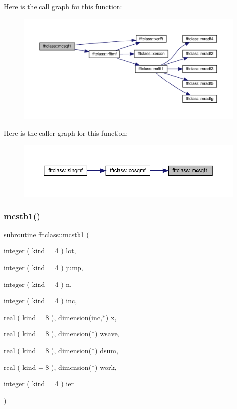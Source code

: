 Here is the call graph for this function\+:\nopagebreak
\begin{figure}[H]
\begin{center}
\leavevmode
\includegraphics[width=350pt]{namespacefftclass_a05d00644e8642979b2c55b7822bbfb03_cgraph}
\end{center}
\end{figure}
Here is the caller graph for this function\+:\nopagebreak
\begin{figure}[H]
\begin{center}
\leavevmode
\includegraphics[width=350pt]{namespacefftclass_a05d00644e8642979b2c55b7822bbfb03_icgraph}
\end{center}
\end{figure}
\mbox{\label{namespacefftclass_a10f96df2a58ce7f2e6ac9eaddf09588e}} 
\subsubsection{\texorpdfstring{mcstb1()}{mcstb1()}}
{\footnotesize\ttfamily subroutine fftclass\+::mcstb1 (\begin{DoxyParamCaption}\item[{integer ( kind = 4 )}]{lot,  }\item[{integer ( kind = 4 )}]{jump,  }\item[{integer ( kind = 4 )}]{n,  }\item[{integer ( kind = 4 )}]{inc,  }\item[{real ( kind = 8 ), dimension(inc,$\ast$)}]{x,  }\item[{real ( kind = 8 ), dimension($\ast$)}]{wsave,  }\item[{real ( kind = 8 ), dimension($\ast$)}]{dsum,  }\item[{real ( kind = 8 ), dimension($\ast$)}]{work,  }\item[{integer ( kind = 4 )}]{ier }\end{DoxyParamCaption})}

